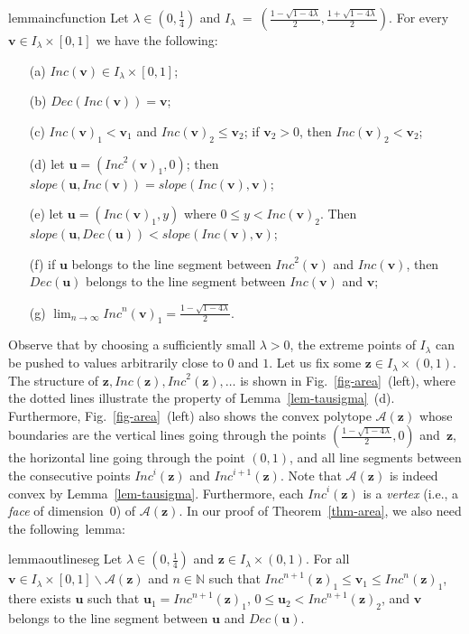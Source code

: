 \documentclass[a4paper,UKenglish,cleveref, autoref, thm-restate]{lipics-v2021}
\newcommand{\N}{\mathbb{N}}
\newcommand{\Area}{\mathcal{A}}
\newcommand{\slope}{\mathit{slope}}
\newcommand{\INC}{\mathit{Inc}}
\newcommand{\DEC}{\mathit{Dec}}
\renewcommand{\vec}[1]{\pmb{#1}}
\begin{document}
\begin{restatable}{lemma}{incfunction}
    \label{lem-tausigma}
    Let $\lambda \in (0,\frac{1}{4})$ and
    \(
   I_\lambda \ = \ \left(\frac{1-\sqrt{1-4\lambda}}{2},  \frac{1+\sqrt{1-4\lambda}}{2}\right)
    \). For every $\vec{v} \in I_\lambda \times [0,1]$ we have the following: 
    \begin{enumerate}
        \item[(a)] $\INC(\vec{v}) \in I_\lambda \times [0,1]$;
        \item[(b)] $\DEC(\INC(\vec{v})) = \vec{v}$;
        \item[(c)] $\INC(\vec{v})_1 < \vec{v}_1$ and $\INC(\vec{v})_2 \leq \vec{v}_2$; if $\vec{v}_2 > 0$, then $\INC(\vec{v})_2 < \vec{v}_2$; 
        \item[(d)] let $\vec{u} = (\INC^2(\vec{v})_1,0)$; then $\slope(\vec{u},\INC(\vec{v})) = \slope(\INC(\vec{v}),\vec{v})$;
        \item[(e)] let $\vec{u} = (\INC(\vec{v})_1,y)$ where $0 \leq y <  \INC(\vec{v})_2$. Then $\slope(\vec{u},\DEC(\vec{u})) < \slope(\INC(\vec{v}),\vec{v})$;
        \item[(f)] if $\vec{u}$ belongs to the line segment between $\INC^2(\vec{v})$ and $\INC(\vec{v})$, then $\DEC(\vec{u})$ belongs to the line segment between $\INC(\vec{v})$ and $\vec{v}$;
        \item[(g)] $\lim_{n \to \infty} \INC^n(\vec{v})_1 =  \frac{1-\sqrt{1-4\lambda}}{2}$.
    \end{enumerate}
\end{restatable}

Observe that by choosing a sufficiently small $\lambda>0$, the extreme points of $I_\lambda$ can be pushed to values arbitrarily close to $0$ and $1$. Let us fix some $\vec{z} \in I_\lambda \times (0,1)$. The structure of $\vec{z}, \INC(\vec{z}), \INC^2(\vec{z}),\ldots$ is shown in Fig.~\ref{fig-area}~(left), where the dotted lines illustrate the property of Lemma~\ref{lem-tausigma}~(d). Furthermore, Fig.~\ref{fig-area}~(left) also shows the convex polytope $\Area(\vec{z})$ whose boundaries are the vertical lines going through the points $(\frac{1-\sqrt{1-4\lambda}}{2},0)$ and~$\vec{z}$, the horizontal line going through the point $(0,1)$, and all line segments between the consecutive points $\INC^i(\vec{z})$ and $\INC^{i+1}(\vec{z})$. Note that $\Area(\vec{z})$ is indeed convex by Lemma~\ref{lem-tausigma}. Furthermore, each $\INC^i(\vec{z})$ is a \emph{vertex} (i.e., a \emph{face} of dimension~$0$) of $\Area(\vec{z})$.
In our proof of Theorem~\ref{thm-area}, we also need the following~lemma:
\begin{restatable}{lemma}{outlineseg}
    \label{lem-outlineseg}
    Let $\lambda \in (0,\frac{1}{4})$ and $\vec{z} \in I_\lambda \times (0,1)$.
    For all $\vec{v} \in I_\lambda \times [0,1] \smallsetminus \Area(\vec{z})$ and $n \in \N$ such that $\INC^{n+1}(\vec{z})_1 \leq \vec{v}_1 \leq \INC^{n}(\vec{z})_1$, there exists $\vec{u}$ such that  
    $\vec{u}_1 = \INC^{n+1}(\vec{z})_1$, $0 \leq \vec{u}_2 < \INC^{n+1}(\vec{z})_2$, and $\vec{v}$ belongs to the line segment between $\vec{u}$ and $\DEC(\vec{u})$.
\end{restatable} 
    
\end{document}
